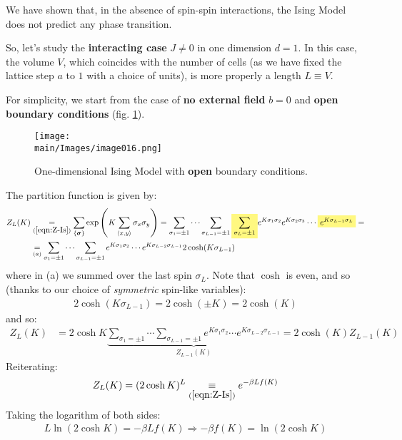 \documentclass[../../main.tex]{subfiles}
\begin{document}

We have shown that, in the absence of spin-spin interactions, the Ising Model does not predict any phase transition. %

\medskip

So, let's study the \textbf{interacting case} $J\neq 0$ in one dimension $d=1$. In this case, the volume $V$, which coincides with the number of cells (as we have fixed the lattice step $a$ to $1$ with a choice of units), is more properly a length $L \equiv V$.

\medskip

For simplicity, we start from the case of \textbf{no external field} $b=0$ and \textbf{open boundary conditions} (fig. \ref{fig:obcd1}).   

\begin{figure}[H]
    \centering
    \texttt{[image: \\main/Images/image016.png]}
    \caption{One-dimensional Ising Model with \textbf{open} boundary conditions.\label{fig:obcd1}}
\end{figure}

The partition function is given by:
\begin{align*}
    Z_L(K) &\underset{(\ref{eqn:Z-Is})}{=} 
    \sum_{\{\bm{\sigma}\}}\exp\left( K \sum_{\langle x,y \rangle} \sigma_x \sigma_y \right) =
    \sum_{\sigma_1 = \pm 1} \cdots \sum_{\sigma_{L-1}=\pm 1} \hlc{Yellow}{\sum_{\sigma_L = \pm 1}} e^{K \sigma_1 \sigma_2} e^{K \sigma_2 \sigma_3} \cdots \hlc{Yellow}{e^{K \sigma_{L-1} \sigma_L}} =\\
    &\underset{(a)}{=}  \sum_{\sigma_1 = \pm 1} \cdots \sum_{\sigma_{L-1}=\pm 1} e^{K \sigma_1 \sigma_2} \cdots e^{K \sigma_{L-2} \sigma_{L-1}} 2 \cosh (K \sigma_{L-1})
\end{align*}
where in (a) we summed over the last spin $\sigma_L$. Note that $\cosh$ is even, and so (thanks to our choice of \textit{symmetric} spin-like variables):
\begin{align*}
   2\cosh(K \sigma_{L-1}) = 2 \cosh(\pm K)  = 2 \cosh(K)
\end{align*}
and so:
\begin{align*}
    Z_L(K) &= 2\cosh K  \underbrace{\sum_{\sigma_1 = \pm 1} \cdots \sum_{\sigma_{L-1}=\pm 1} e^{K \sigma_1 \sigma_2} \cdots e^{K \sigma_{L-2} \sigma_{L-1}} }_{Z_{L-1}(K)}  = 2\cosh (K) Z_{L-1}(K)
\end{align*}
Reiterating:
\begin{align*}
    Z_L(K) = (2\cosh K)^L \underset{(\ref{eqn:Z-Is})}{\equiv}  e^{- \beta L f(K)} 
\end{align*}
Taking the logarithm of both sides:
\begin{align*}
    L \ln (2 \cosh K) = -\beta L f(K) \Rightarrow -\beta f(K) = \ln(2\cosh K)
\end{align*}
\end{document}
